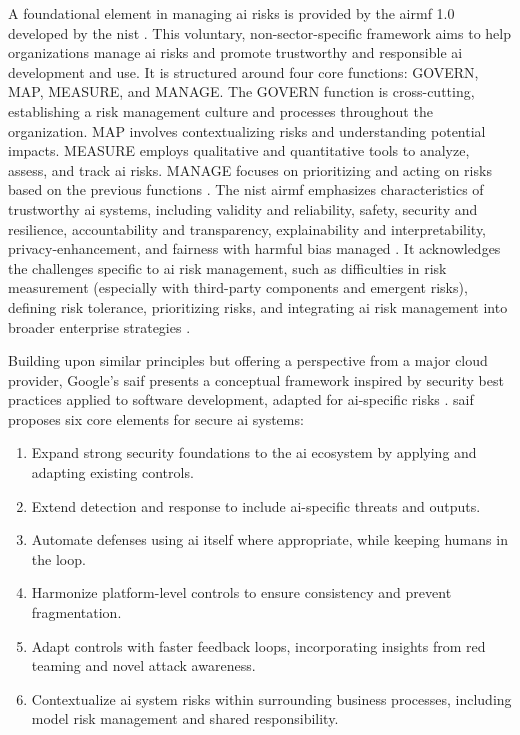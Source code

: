 A foundational element in managing \gls{ai} risks is provided by the \gls{airmf} 1.0 developed by the \gls{nist} \cite{tabassi_artificial_2023}. This voluntary, non-sector-specific framework aims to help organizations manage \gls{ai} risks and promote trustworthy and responsible \gls{ai} development and use. It is structured around four core functions: GOVERN, MAP, MEASURE, and MANAGE. The GOVERN function is cross-cutting, establishing a risk management culture and processes throughout the organization. MAP involves contextualizing risks and understanding potential impacts. MEASURE employs qualitative and quantitative tools to analyze, assess, and track \gls{ai} risks. MANAGE focuses on prioritizing and acting on risks based on the previous functions \cite{tabassi_artificial_2023}. The \gls{nist} \gls{airmf} emphasizes characteristics of trustworthy \gls{ai} systems, including validity and reliability, safety, security and resilience, accountability and transparency, explainability and interpretability, privacy-enhancement, and fairness with harmful bias managed \cite{tabassi_artificial_2023}. It acknowledges the challenges specific to \gls{ai} risk management, such as difficulties in risk measurement (especially with third-party components and emergent risks), defining risk tolerance, prioritizing risks, and integrating \gls{ai} risk management into broader enterprise strategies \cite{tabassi_artificial_2023}.

Building upon similar principles but offering a perspective from a major cloud provider, Google's \gls{saif} presents a conceptual framework inspired by security best practices applied to software development, adapted for \gls{ai}-specific risks \cite{hansen_introducing_2023}. \gls{saif} proposes six core elements for secure \gls{ai} systems\cite{hansen_introducing_2023}:

\begin{enumerate}
\item Expand strong security foundations to the \gls{ai} ecosystem by applying and adapting existing controls.
\item Extend detection and response to include \gls{ai}-specific threats and outputs.
\item Automate defenses using \gls{ai} itself where appropriate, while keeping humans in the loop.
\item Harmonize platform-level controls to ensure consistency and prevent fragmentation.
\item Adapt controls with faster feedback loops, incorporating insights from red teaming and novel attack awareness.
\item Contextualize \gls{ai} system risks within surrounding business processes, including model risk management and shared responsibility.
\end{enumerate}

